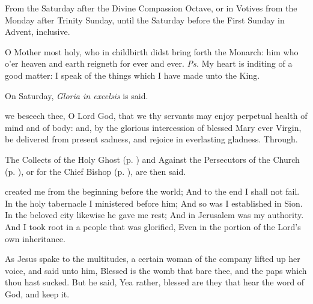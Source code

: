 \begin{rubric}
    {From the Saturday after the Divine Compassion Octave, or in Votives from the Monday after Trinity Sunday, until the Saturday before the First Sunday in Advent, inclusive.}
\end{rubric}
\introit
{} O Mother most holy, who in childbirth didst bring forth the Monarch: him who o'er heaven and earth reigneth for ever and ever. \textit{Ps.} My heart is inditing of a good matter: I speak of the things which I have made unto the King.
\begin{rubric}
    On Saturday, \emph{Gloria in excelsis} is said.
\end{rubric}
\collect
{} we beseech thee, O Lord God, that we thy servants may enjoy perpetual health of mind and of body: and, by the glorious intercession of blessed Mary ever Virgin, be delivered from present sadness, and rejoice in everlasting gladness. Through.
\begin{rubric}
    The Collects of the Holy Ghost (p. \pageref{SPHolyGhost}) and Against the Persecutors of the Church (p. \pageref{SPAgainst}), or for the Chief Bishop (p. \pageref{SPChiefBishop}), are then said.
\end{rubric}
 created me from the beginning before the world; And to the end I shall not fail. In the holy tabernacle I ministered before him; And so was I established in Sion. In the beloved city likewise he gave me rest; And in Jerusalem was my authority. And I took root in a people that was glorified, Even in the portion of the Lord’s own inheritance.

\vspace{-1.5ex}

 As Jesus spake to the multitudes, a certain woman of the company lifted up her voice, and said unto him, Blessed is the womb that bare thee, and the paps which thou hast sucked. But he said, Yea rather, blessed are they that hear the word of God, and keep it.

